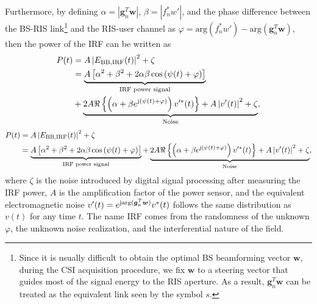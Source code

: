 \documentclass[journal,twocolumn]{IEEEtran}
\theoremstyle{nonumberplain}
\def \arg {\text{arg}}
\begin{document}
    Furthermore, by defining $\alpha = \left\vert\bm g_{n}^{T}\bm w\right\vert$, $\beta = \left\vert f_{n}^{*} w' \right\vert$, and the phase difference between the \ac{BS}-RIS link\footnote{Since it is usually difficult to obtain the optimal BS beamforming vector $\bm w$, during the CSI acquisition procedure, we fix $\bm w$ to a steering vector that guides most of the signal energy to the RIS aperture. As a result, $\bm g_n^T \bm w$ can be treated as the equivalent link seen by the symbol $s$.} and the RIS-user channel as $\varphi = \arg\left(f_{n}^{*}w'\right)-\arg\left(\bm g_{n}^{T}\bm w\right)$, then the power of the \ac{IRF} can be written as
    \ifx\onecol\undefined
        \begin{equation}
            \label{eqn:power of interference}
            \begin{aligned}
                P(t)&=A \left| E_{{\rm BB, IRF}} (t)\right |^{2}+\zeta\\
                &=\underbrace{A\left[\alpha^{2}+\beta^{2}+2\alpha\beta\cos\left(\psi(t)+\varphi\right)\right]}_{\text{IRF power signal}}\\
                &+\underbrace{2A\Re\left\{\left(\alpha+\beta e^{{\rm j}\left(\psi(t)+\varphi\right)}\right)v'^{*}(t)\right\}+A\left|v'(t)\right|^{2}+\zeta}_{\text{Noise}},\\
            \end{aligned}
        \end{equation}
    \else 
        \begin{equation}
            \label{eqn:power of interference}
            \begin{aligned}
                P(t)&=A \left| E_{{\rm BB, IRF}} (t)\right |^{2}+\zeta\\
                &=\underbrace{A\left[\alpha^{2}+\beta^{2}+2\alpha\beta\cos\left(\psi(t)+\varphi\right)\right]}_{\text{IRF power signal}}+\underbrace{2A\Re\left\{\left(\alpha+\beta e^{{\rm j}\left(\psi(t)+\varphi\right)}\right)v'^{*}(t)\right\}+A\left|v'(t)\right|^{2}+\zeta}_{\text{Noise}},\\
            \end{aligned}
        \end{equation}
    \fi
    where $\zeta$ is the noise introduced by digital signal processing after measuring the IRF power, $A$ is the amplification factor of the power sensor, and the equivalent electromagnetic noise $v'(t) = e^{{\rm j}{\rm arg}({\bm g}_n^T \bm w)}v^*(t)$ follows the same distribution as $v(t)$ for any time $t$.
    The name IRF comes from the randomness of the unknown $\varphi$, the unknown noise realization, and the interferential nature of the field.
\end{document}

